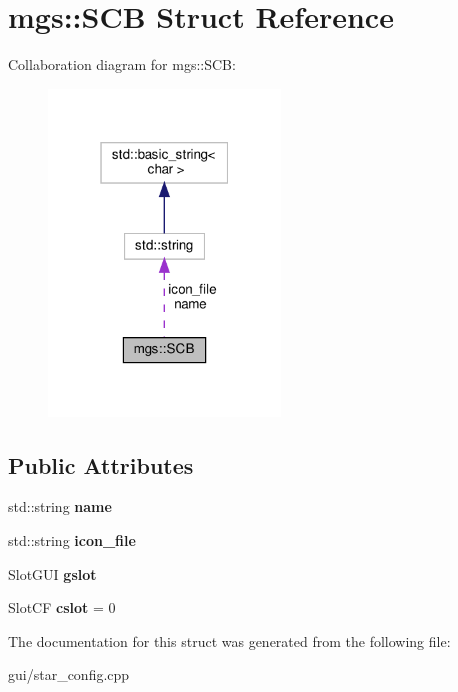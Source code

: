 \hypertarget{structmgs_1_1SCB}{}\section{mgs\+:\+:S\+CB Struct Reference}
\label{structmgs_1_1SCB}


Collaboration diagram for mgs\+:\+:S\+CB\+:
\nopagebreak
\begin{figure}[H]
\begin{center}
\leavevmode
\includegraphics[width=175pt]{structmgs_1_1SCB__coll__graph}
\end{center}
\end{figure}
\subsection*{Public Attributes}
\begin{DoxyCompactItemize}
\item 
\mbox{\label{structmgs_1_1SCB_aeb234f5f62710971cec0547ffd399871}} 
std\+::string {\bfseries name}
\item 
\mbox{\label{structmgs_1_1SCB_a497fb0e8f4dc7433e6552036adc00d22}} 
std\+::string {\bfseries icon\+\_\+file}
\item 
\mbox{\label{structmgs_1_1SCB_a3efa8f6d825f9178ada2d68a53671ff6}} 
Slot\+G\+UI {\bfseries gslot}
\item 
\mbox{\label{structmgs_1_1SCB_a42a2cf2e81cf1a81646b0363feae808f}} 
Slot\+CF {\bfseries cslot} = 0
\end{DoxyCompactItemize}


The documentation for this struct was generated from the following file\+:\begin{DoxyCompactItemize}
\item 
gui/star\+\_\+config.\+cpp\end{DoxyCompactItemize}
